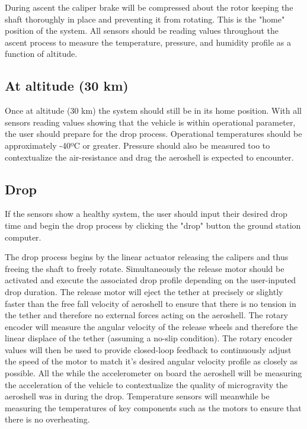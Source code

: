 \indent\indent During ascent the caliper brake will be compressed about the rotor keeping the shaft thoroughly in place and preventing it from rotating. This is the "home" position of the system. All sensors should be reading values throughout the ascent process to measure the temperature, pressure, and humidity profile as a function of altitude. 

\subsection*{At altitude (30 km)}

\indent\indent Once at altitude (30 km) the system should still be in its home position. With all sensors reading values showing that the vehicle is within operational parameter, the user should prepare for the drop process. Operational temperatures should be approximately -40ºC or greater. Pressure should also be measured too to contextualize the air-resistance and drag the aeroshell is expected to encounter. 

\subsection*{Drop}

\indent\indent If the sensors show a healthy system, the user should input their desired drop time and begin the drop process by clicking the "drop" button the ground station computer. 

The drop process begins by the linear actuator releasing the calipers and thus freeing the shaft to freely rotate. Simultaneously the release motor should be activated and execute the associated drop profile depending on the user-inputed drop duration. The release motor will eject the tether at precisely or slightly faster than the free fall velocity of aeroshell to ensure that there is no tension in the tether and therefore no external forces acting on the aeroshell. The rotary encoder will measure the angular velocity of the release wheels and therefore the linear displace of the tether (assuming a no-slip condition). The rotary encoder values will then be used to provide closed-loop feedback to continuously adjust the speed of the motor to match it's desired angular velocity profile as closely as possible. All the while the accelerometer on board the aeroshell will be measuring the acceleration of the vehicle to contextualize the quality of microgravity the aeroshell was in during the drop. Temperature sensors will meanwhile be measuring the temperatures of key components such as the motors to ensure that there is no overheating. 


